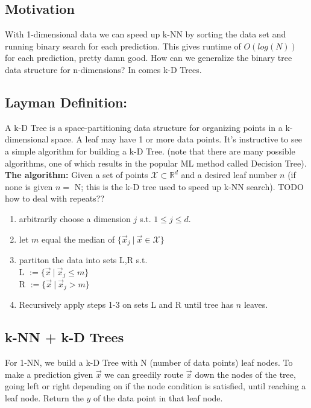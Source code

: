 \documentclass[10pt]{article}
\begin{document}
	\subsection*{Motivation}
		With 1-dimensional data we can speed up k-NN by sorting the data set and running binary search for 
		each prediction. This gives runtime of $O(log(N))$ for each prediction, pretty damn good.  How can we 
		generalize the binary tree data structure for n-dimensions? In comes k-D Trees. 
	\subsection*{Layman Definition:} 
		A  k-D Tree is a space-partitioning data structure for organizing points in a k-dimensional space. A leaf may 
		have 1 or more data points. It's instructive to see a simple algorithm for building a k-D Tree. (note that 
		there are many possible algorithms, one of which results in the popular ML method called Decision Tree).  \\ 

		\noindent \textbf{The algorithm:} Given a set of points $\mathcal X \subset \mathbb{R}^d$ and a desired 
		leaf number $n$ (if none is given $n = $ N; this is the k-D tree used to speed up k-NN search). 
		TODO how to deal with repeats??
	
		\begin{enumerate}
			\item arbitrarily choose a dimension $j$ s.t. $1 \leq j \leq d$. 
			\item let $m$ equal the median of $ \{ \vec x_j \ | \ \vec x \in \mathcal X \} $
			\item partiton the data into sets L,R s.t. \\
				L $:= \{\vec x \ | \ \vec x_j \leq m \}$\\
				R $:= \{\vec x \ | \ \vec x_j > m \}$
			\item Recursively apply steps 1-3 on sets L and R until tree has $n$ leaves. 
		\end{enumerate} 
	
	\subsection*{k-NN + k-D Trees}
		For 1-NN, we build a k-D Tree with N (number of data points) leaf nodes. To make a prediction given 
		$\vec x $ we can greedily route $\vec x$ down the nodes of the tree, going left or right depending on 
		if the node condition is satisfied, until reaching a leaf node. Return the $y$ of the data point in that leaf node.  \\
	
\end{document}

